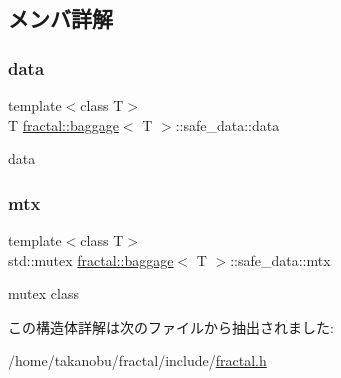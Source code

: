 \subsection{メンバ詳解}
\mbox{\label{structfractal_1_1baggage_1_1safe__data_afd9e1db72a670350da2a7fe2dbb17376}} 
\subsubsection{\texorpdfstring{data}{data}}
{\footnotesize\ttfamily template$<$class T$>$ \\
T \hyperlink{classfractal_1_1baggage}{fractal\+::baggage}$<$ T $>$\+::safe\+\_\+data\+::data}



data 

\mbox{\label{structfractal_1_1baggage_1_1safe__data_a7a9929c47da7c72ea70f4f0b47609bc8}} 
\subsubsection{\texorpdfstring{mtx}{mtx}}
{\footnotesize\ttfamily template$<$class T$>$ \\
std\+::mutex \hyperlink{classfractal_1_1baggage}{fractal\+::baggage}$<$ T $>$\+::safe\+\_\+data\+::mtx}



mutex class 



この構造体詳解は次のファイルから抽出されました\+:\begin{DoxyCompactItemize}
\item 
/home/takanobu/fractal/include/\hyperlink{fractal_8h}{fractal.\+h}\end{DoxyCompactItemize}
